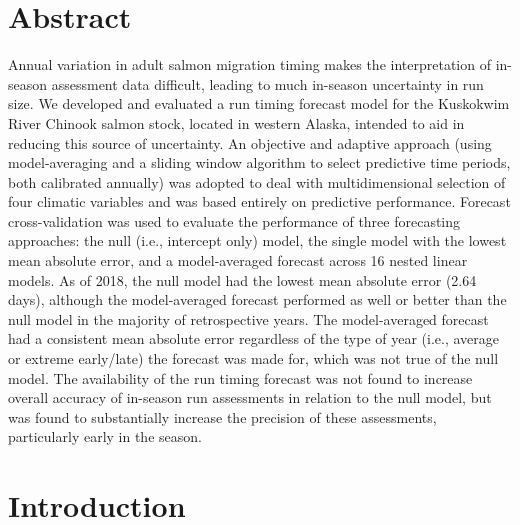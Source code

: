 \documentclass[12pt,]{book}
\theoremstyle{definition}
\theoremstyle{definition}
\theoremstyle{definition}
\theoremstyle{remark}
\begin{document}
\section*{Abstract}\label{abstract}

Annual variation in adult salmon migration timing makes the
interpretation of in-season assessment data difficult, leading to much
in-season uncertainty in run size. We developed and evaluated a run
timing forecast model for the Kuskokwim River Chinook salmon stock,
located in western Alaska, intended to aid in reducing this source of
uncertainty. An objective and adaptive approach (using model-averaging
and a sliding window algorithm to select predictive time periods, both
calibrated annually) was adopted to deal with multidimensional selection
of four climatic variables and was based entirely on predictive
performance. Forecast cross-validation was used to evaluate the
performance of three forecasting approaches: the null (i.e., intercept
only) model, the single model with the lowest mean absolute error, and a
model-averaged forecast across 16 nested linear models. As of 2018, the
null model had the lowest mean absolute error (2.64 days), although the
model-averaged forecast performed as well or better than the null model
in the majority of retrospective years. The model-averaged forecast had
a consistent mean absolute error regardless of the type of year (i.e.,
average or extreme early/late) the forecast was made for, which was not
true of the null model. The availability of the run timing forecast was
not found to increase overall accuracy of in-season run assessments in
relation to the null model, but was found to substantially increase the
precision of these assessments, particularly early in the season.

\section{Introduction}\label{introduction}
\end{document}
